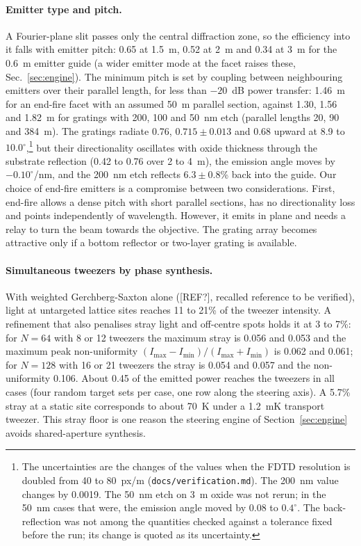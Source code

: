 \paragraph{Emitter type and pitch.} A Fourier-plane slit passes only the central diffraction zone, so the efficiency into it falls with emitter pitch: 0.65 at 1.5~\textmu m, 0.52 at 2~\textmu m and 0.34 at 3~\textmu m for the 0.6~\textmu m emitter guide (a wider emitter mode at the facet raises these, Sec.~\ref{sec:engine}). The minimum pitch is set by coupling between neighbouring emitters over their parallel length, for less than $-20$~dB power transfer: 1.46~\textmu m for an end-fire facet with an assumed 50~\textmu m parallel section, against 1.30, 1.56 and 1.82~\textmu m for gratings with 200, 100 and 50~nm etch (parallel lengths 20, 90 and 384~\textmu m). The gratings radiate 0.76, $0.715\pm0.013$ and 0.68 upward at 8.9 to $10.0^\circ$,\footnote{The uncertainties are the changes of the values when the FDTD resolution is doubled from 40 to 80~px/\textmu m (\texttt{docs/\allowbreak verification.md}). The 200~nm value changes by 0.0019. The 50~nm etch on 3~\textmu m oxide was not rerun; in the 50~nm cases that were, the emission angle moved by 0.08 to $0.4^\circ$. The back-reflection was not among the quantities checked against a tolerance fixed before the run; its change is quoted as its uncertainty.} but their directionality oscillates with oxide thickness through the substrate reflection (0.42 to 0.76 over 2 to 4~\textmu m), the emission angle moves by $-0.10^\circ$/nm, and the 200~nm etch reflects $6.3\pm0.8$\% back into the guide. Our choice of end-fire emitters is a compromise between two considerations. First, end-fire allows a dense pitch with short parallel sections, has no directionality loss and points independently of wavelength. However, it emits in plane and needs a relay to turn the beam towards the objective. The grating array becomes attractive only if a bottom reflector or two-layer grating is available.

\paragraph{Simultaneous tweezers by phase synthesis.} With weighted Gerchberg-Saxton alone ([REF?], recalled reference to be verified), light at untargeted lattice sites reaches 11 to 21\% of the tweezer intensity. A refinement that also penalises stray light and off-centre spots holds it at 3 to 7\%: for $N = 64$ with 8 or 12 tweezers the maximum stray is 0.056 and 0.053 and the maximum peak non-uniformity $(I_\mathrm{max}-I_\mathrm{min})/(I_\mathrm{max}+I_\mathrm{min})$ is 0.062 and 0.061; for $N = 128$ with 16 or 21 tweezers the stray is 0.054 and 0.057 and the non-uniformity 0.106. About 0.45 of the emitted power reaches the tweezers in all cases (four random target sets per case, one row along the steering axis). A 5.7\% stray at a static site corresponds to about 70~\textmu K under a 1.2~mK transport tweezer. This stray floor is one reason the steering engine of Section~\ref{sec:engine} avoids shared-aperture synthesis.

